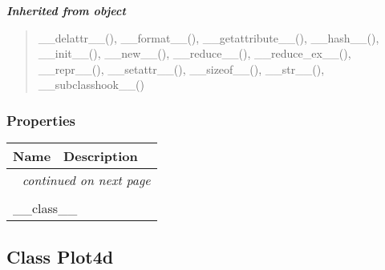 \large{\textbf{\textit{Inherited from object}}}

\begin{quote}
\_\_delattr\_\_(), \_\_format\_\_(), \_\_getattribute\_\_(), \_\_hash\_\_(), \_\_init\_\_(), \_\_new\_\_(), \_\_reduce\_\_(), \_\_reduce\_ex\_\_(), \_\_repr\_\_(), \_\_setattr\_\_(), \_\_sizeof\_\_(), \_\_str\_\_(), \_\_subclasshook\_\_()
\end{quote}


  \subsubsection{Properties}

    \vspace{-1cm}
\hspace{\varindent}\begin{longtable}{|p{\varnamewidth}|p{\vardescrwidth}|l}
\cline{1-2}
\cline{1-2} \centering \textbf{Name} & \centering \textbf{Description}& \\
\cline{1-2}
\endhead\cline{1-2}\multicolumn{3}{r}{\small\textit{continued on next page}}\\\endfoot\cline{1-2}
\endlastfoot\multicolumn{2}{|l|}{\textit{Inherited from object}}\\
\multicolumn{2}{|p{\varwidth}|}{\raggedright \_\_class\_\_}\\
\cline{1-2}
\end{longtable}



\subsection{Class Plot4d}

